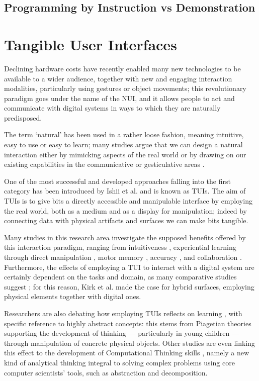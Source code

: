 \subsection{Programming by Instruction vs Demonstration}

\section{Tangible User Interfaces}
Declining hardware costs have recently enabled many new technologies to be available to a wider audience, together with new and engaging interaction modalities, particularly using gestures or object movements; this revolutionary paradigm goes under the name of the \ac{NUI}, and it allows people to act and communicate with digital systems in ways to which they are naturally predisposed.

The term `natural' has been used in a rather loose fashion, meaning intuitive, easy to use or easy to learn; many studies argue that we can design a natural interaction either by mimicking aspects of the real world \cite{Jacob:2008dj} or by drawing on our existing capabilities in the communicative or gesticulative areas \cite{Wigdor:2011:BNW:1995309}.

One of the most successful and developed approaches falling into the first category has been introduced by Ishii et al. \cite{Ishii:1997gy} and is known as \acp{TUI}. The aim of \acp{TUI} is to give bits a directly accessible and manipulable interface by employing the real world, both as a medium and as a display for manipulation; indeed by connecting data with physical artifacts and surfaces we can make bits tangible. 

Many studies in this research area investigate the supposed benefits offered by this interaction paradigm, ranging from intuitiveness \cite{Ishii:1997gy}, experiential learning through direct manipulation \cite{Manches:2009kg, Parkes:2008bu}, motor memory \cite{Weiss:2009ct}, accuracy \cite{Muller:2014kx}, and collaboration \cite{Subramanian:2007kx}. Furthermore, the effects of employing a \ac{TUI} to interact with a digital system are certainly dependent on the tasks and domain, as many comparative studies suggest \cite{Weiss:2009ct, Muller:2014kx, Hancock:2009bg}; for this reason, Kirk et al. \cite{Kirk:2009ue} made the case for hybrid surfaces, employing physical elements together with digital ones.

Researchers are also debating how employing \acp{TUI} reflects on learning \cite{Horn:2009be,Marshall:2007dr,Antle:2013ho}, with specific reference to highly abstract concepts: this stems from Piagetian theories supporting the development of thinking --- particularly in young children --- through manipulation of concrete physical objects. Other studies \cite{Wang:2014jy,Horn:2011ch} are even linking this effect to the development of Computational Thinking skills \cite{Wing:2006iz}, namely a new kind of analytical thinking integral to solving complex problems using core computer scientists' tools, such as abstraction and decomposition.

